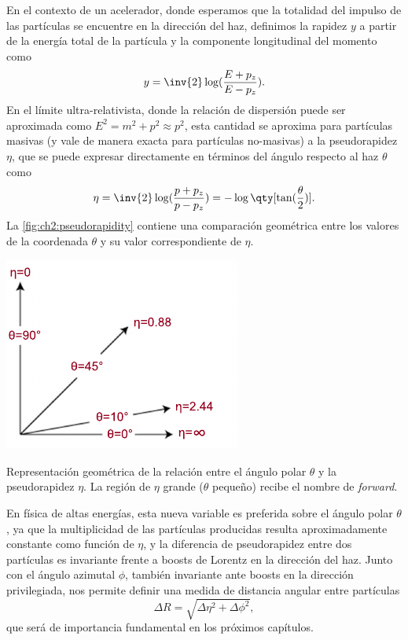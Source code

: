 En el contexto de un acelerador, donde esperamos que la totalidad del impulso de las partículas se encuentre en la dirección del haz, definimos la rapidez $y$ a partir de la energía total de la partícula y la componente longitudinal del momento como
\[ y = \inv{2} \log(\frac{E + p_z}{E - p_z}). \]
En el límite ultra-relativista, donde la relación de dispersión puede ser aproximada como $E^2 = m^2 + p^2 \approx p^2$, esta cantidad se aproxima para partículas masivas (y vale de manera exacta para partículas no-masivas) a la pseudorapidez $\eta$, que se puede expresar directamente en términos del ángulo respecto al haz $\theta$ como
\[ \eta = \inv{2} \log(\frac{p + p_z}{p - p_z}) = -\log\qty[ \tan(\frac{\theta}{2})]. \]
La \cref{fig:ch2:pseudorapidity} contiene una comparación geométrica entre los valores de la coordenada $\theta$ y su valor correspondiente de $\eta$.
\begin{marginfigure}
    \includegraphics[width=\linewidth]{Assets/Images/Pseudorapidity.pdf}
    \caption{Representación geométrica de la relación entre el ángulo polar $\theta$ y la pseudorapidez $\eta$. La región de $\eta$ grande ($\theta$ pequeño) recibe el nombre de \textit{forward}.}
    \label{fig:ch2:pseudorapidity}
\end{marginfigure}
En física de altas energías, esta nueva variable es preferida sobre el ángulo polar $\theta$, ya que la multiplicidad de las partículas producidas resulta aproximadamente constante como función de $\eta$, y la diferencia de pseudorapidez entre dos partículas es invariante frente a boosts de Lorentz en la dirección del haz. Junto con el ángulo azimutal $\phi$, también invariante ante boosts en la dirección privilegiada, nos permite definir una medida de distancia angular entre partículas
\[ \Delta R = \sqrt{\Delta\eta^2 + \Delta\phi^2}, \]
que será de importancia fundamental en los próximos capítulos.

